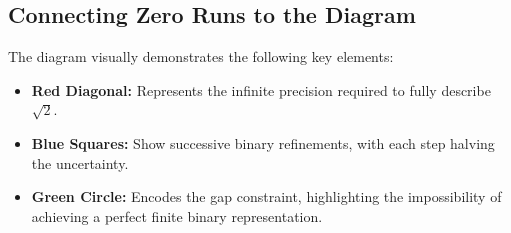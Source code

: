 \subsection{Connecting Zero Runs to the Diagram}
The diagram visually demonstrates the following key elements:
\begin{itemize}
    \item \textbf{Red Diagonal:} Represents the infinite precision required to fully describe $\sqrt{2}$.
    \item \textbf{Blue Squares:} Show successive binary refinements, with each step halving the uncertainty.
    \item \textbf{Green Circle:} Encodes the gap constraint, highlighting the impossibility of achieving a perfect finite binary representation.
\end{itemize}
